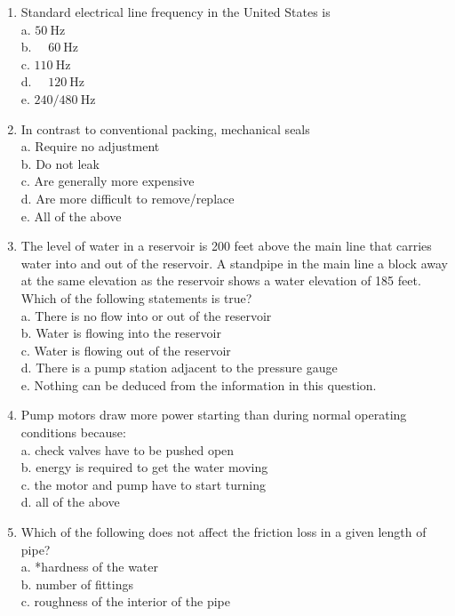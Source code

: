 \begin{enumerate}[1.]
\item Standard electrical line frequency in the United States is\\
a. $50 \mathrm{~Hz}$\\
b. $\quad 60 \mathrm{~Hz}$\\
c. $110 \mathrm{~Hz}$\\
d. $\quad 120 \mathrm{~Hz}$\\
e. $240 / 480 \mathrm{~Hz}$\\
\item In contrast to conventional packing, mechanical seals\\
a. Require no adjustment\\
b. Do not leak\\
c. Are generally more expensive\\
d. Are more difficult to remove/replace\\
e. All of the above\\
\item The level of water in a reservoir is 200 feet above the main line that carries water into and out of the reservoir. A standpipe in the main line a block away at the same elevation as the reservoir shows a water elevation of 185 feet. Which of the following statements is true?\\
a. There is no flow into or out of the reservoir\\
b. Water is flowing into the reservoir\\
c. Water is flowing out of the reservoir\\
d. There is a pump station adjacent to the pressure gauge\\
e. Nothing can be deduced from the information in this question.\\
\item Pump motors draw more power starting than during normal operating conditions because:\\
a. check valves have to be pushed open\\
b. energy is required to get the water moving\\
c. the motor and pump have to start turning\\
d. all of the above\\
\item Which of the following does not affect the friction loss in a given length of pipe?\\
a. *hardness of the water\\
b. number of fittings\\
c. roughness of the interior of the pipe\\

\end{enumerate}
